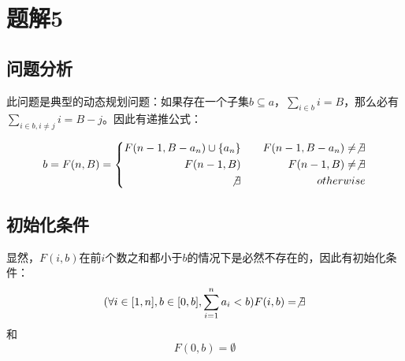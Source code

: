 \section{题解5}
\subsection{问题分析}
此问题是典型的动态规划问题：如果存在一个子集$b\subseteq a$，$\sum_{i\in b}i=B$，那么必有$\sum_{i\in b,i\not =j}i=B-j$。因此有递推公式：

$$
b=F(n,B)=\left\{
\begin{aligned}
F(n-1,B-a_{n})\cup\{a_n\}&\quad&F(n-1,B-a_{n})\not =\not\exists\\
F(n-1,B)&&F(n-1,B)\not =\not\exists\\
\not\exists&&otherwise\\
\end{aligned}
\right.
$$

\subsection{初始化条件}
显然，$F(i,b)$在前$i$个数之和都小于$b$的情况下是必然不存在的，因此有初始化条件：
$$
(\forall i\in[1,n],b\in[0,b],\sum_{i=1}^na_i<b)F(i,b)=\not\exists
$$
和
$$F(0,b)=\emptyset$$